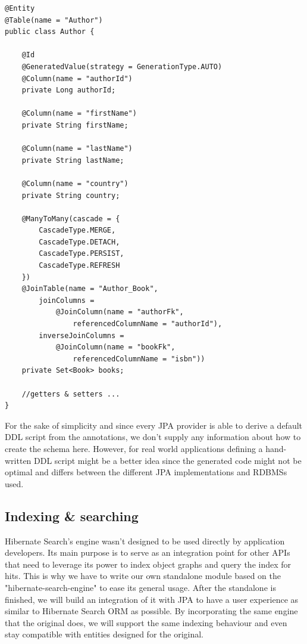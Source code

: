 \lstset{language=java}
\begin{lstlisting}[frame=htrbl, caption={Author.java}, label={lst:author.java_1}]
@Entity
@Table(name = "Author")
public class Author {
	
	@Id
	@GeneratedValue(strategy = GenerationType.AUTO)
	@Column(name = "authorId")
	private Long authorId;
	
	@Column(name = "firstName")
	private String firstName;
	
	@Column(name = "lastName")
	private String lastName;
	
	@Column(name = "country")
	private String country;
	
	@ManyToMany(cascade = {
		CascadeType.MERGE, 
		CascadeType.DETACH, 
		CascadeType.PERSIST, 
		CascadeType.REFRESH
	})
	@JoinTable(name = "Author_Book", 
		joinColumns = 
			@JoinColumn(name = "authorFk", 
				referencedColumnName = "authorId"),
		inverseJoinColumns = 
			@JoinColumn(name = "bookFk", 
				referencedColumnName = "isbn"))
	private Set<Book> books;
	
	//getters & setters ...
}
\end{lstlisting}
For the sake of simplicity and since every JPA provider is able to derive a default DDL script from the annotations, we don't supply any information about how to create the schema here. However, for real world applications defining a hand-written DDL script might be a better idea since the generated code might not be optimal and differs between the different JPA implementations and RDBMSs used.

\subsection{Indexing \& searching} \label{problem_indexing_searching}
Hibernate Search's engine wasn't designed to be used directly by application developers. Its main purpose is to serve as an integration point for other APIs that need to leverage its power to index object graphs and query the index for hits. This is why we have to write our own standalone module based on the "hibernate-search-engine" to ease its general usage. After the standalone is finished, we will build an integration of it with JPA to have a user experience as similar to Hibernate Search ORM as possible. By incorporating the same engine that the original does, we will support the same indexing behaviour and even stay compatible with entities designed for the original.

